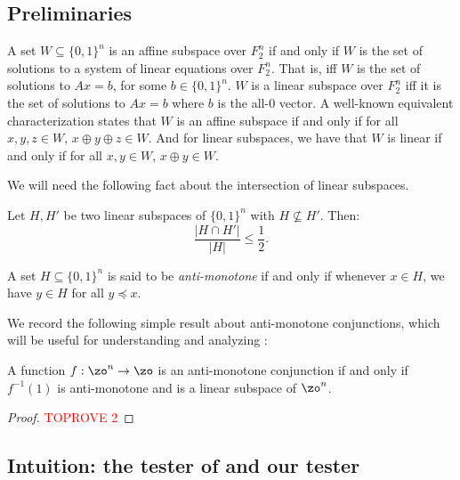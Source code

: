 \documentclass[11pt]{article}
\theoremstyle{definition}
\begin{document}
\subsection{Preliminaries}
\begin{definition}[Subspaces]  \label{def:affine-subspace}
A set $W \subseteq \{0,1\}^n$ is an affine subspace over $F_2^n$ if and only if $W$ is the set of solutions to a system of linear equations over $F_2^n$. That is, iff $W$ is the set of solutions to $Ax=b$, for some $b \in \{0,1\}^n$. 
$W$ is a linear subspace  over $F_2^n$ iff it is the set of solutions to $Ax=b$ where $b$ is the all-0 vector.
A well-known equivalent characterization states that $W$ is an affine subspace if and only if for all $x,y,z \in W$, $x \oplus y \oplus z \in W$.
And for linear subspaces, we have that $W$ is linear if and only if for all $x,y \in W$, $x \oplus y \in W$.
\end{definition}

We will need the following fact about the intersection of linear subspaces. 



\begin{fact}\label{claim:PRS-15}
    Let $H, H'$ be two linear subspaces of $\{0,1\}^n$ with $H \not \subseteq H'$. Then: 
    \[\frac{|H \cap H'|}{ |H| } \leq \frac{1}{2}.\]
\end{fact}

\begin{definition}
A set $H \subseteq \{0,1\}^n$ is said to be \emph{anti-monotone} if and only if whenever $x \in H$, we have $y \in H$ for all $y \preceq x$. 
\end{definition}

We record the following simple result about anti-monotone conjunctions, which will be useful for understanding and analyzing :

 \begin{lemma}\label{lem: monotone conj characterization}
     A function $f: \zo^n \to \zo$ is an anti-monotone conjunction if and only if $f^{-1}(1)$ is anti-monotone and is a linear subspace of $\zo^n$. 
 \end{lemma}

 
\begin{proof}\textcolor{red}{TOPROVE 2}\end{proof}
 
\subsection{Intuition: the tester of \cite{PRS02} and our tester}
\label{sec:conjunction-intuition}
\end{document}
